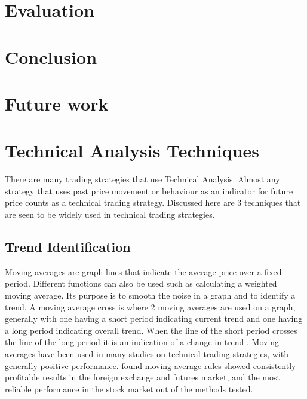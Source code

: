 \documentclass{article}
\theoremstyle{definition}
\begin{document}
\section{Evaluation}

\section{Conclusion}

\section{Future work}

\appendix

\section{Technical Analysis Techniques}

\label{app:tatechniques}

There are many trading strategies that use Technical Analysis. Almost any strategy that uses past price movement or behaviour as an indicator for future price counts as a technical trading strategy. Discussed here are 3 techniques that are seen to be widely used in technical trading strategies.

\subsection{Trend Identification}
Moving averages are graph lines that indicate the average price over a fixed period. Different functions can also be used such as calculating a weighted moving average. Its purpose is to smooth the noise in a graph and to identify a trend. A moving average cross is where 2 moving averages are used on a graph, generally with one having a short period indicating current trend and one having a long period indicating overall trend. When the line of the short period crosses the line of the long period it is an indication of a change in trend \citep{brock1992}. Moving averages have been used in many studies on technical trading strategies, with generally positive performance. \cite{taprofitability} found moving average rules showed consistently profitable results in the foreign exchange and futures market, and the most reliable performance in the stock market out of the methods tested.
\end{document}
